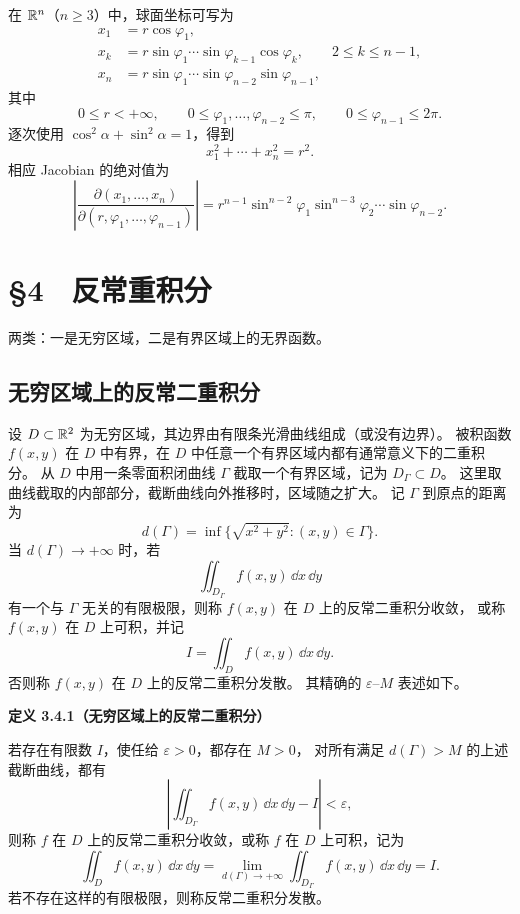 在 $\mathbb{R}^n$（$n\ge3$）中，球面坐标可写为
\[
\begin{aligned}
x_1&=r\cos\varphi_1,\\
x_k&=r\sin\varphi_1\cdots\sin\varphi_{k-1}\cos\varphi_k,
\qquad 2\le k\le n-1,\\
x_n&=r\sin\varphi_1\cdots\sin\varphi_{n-2}\sin\varphi_{n-1},
\end{aligned}
\]
其中
\[
0\le r<+\infty,\qquad
0\le\varphi_1,\ldots,\varphi_{n-2}\le\pi,\qquad
0\le\varphi_{n-1}\le2\pi.
\]
逐次使用 $\cos^2\alpha+\sin^2\alpha=1$，得到
\[
x_1^2+\cdots+x_n^2=r^2.
\]
相应 Jacobian 的绝对值为
\[
\left|\frac{\partial(x_1,\ldots,x_n)}
{\partial(r,\varphi_1,\ldots,\varphi_{n-1})}\right|
=r^{n-1}\sin^{n-2}\varphi_1\sin^{n-3}\varphi_2\cdots\sin\varphi_{n-2}.
\]









\section*{§4　反常重积分}

两类：一是无穷区域，二是有界区域上的无界函数。

\subsection*{无穷区域上的反常二重积分}

设 $D\subset\mathbb{R}^2$ 为无穷区域，其边界由有限条光滑曲线组成（或没有边界）。
被积函数 $f(x,y)$ 在 $D$ 中有界，在 $D$ 中任意一个有界区域内都有通常意义下的二重积分。
从 $D$ 中用一条零面积闭曲线 $\Gamma$ 截取一个有界区域，记为 $D_\Gamma\subset D$。
这里取曲线截取的内部部分，截断曲线向外推移时，区域随之扩大。
记 $\Gamma$ 到原点的距离为
\[
d(\Gamma)=\inf\{\sqrt{x^2+y^2}:(x,y)\in\Gamma\}.
\]
当 $d(\Gamma)\to+\infty$ 时，若
\[
\displaystyle\iint_{D_\Gamma}f(x,y)\,\dd x\,\dd y
\]
有一个与 $\Gamma$ 无关的有限极限，则称 $f(x,y)$ 在 $D$ 上的反常二重积分收敛，
或称 $f(x,y)$ 在 $D$ 上可积，并记
\[
I=\displaystyle\iint_Df(x,y)\,\dd x\,\dd y.
\]
否则称 $f(x,y)$ 在 $D$ 上的反常二重积分发散。
其精确的 $\varepsilon$--$M$ 表述如下。



\textbf{定义 3.4.1（无穷区域上的反常二重积分）}


若存在有限数 $I$，使任给 $\varepsilon>0$，都存在 $M>0$，
对所有满足 $d(\Gamma)>M$ 的上述截断曲线，都有
\[
\left|\displaystyle\iint_{D_\Gamma}f(x,y)\,\dd x\,\dd y-I\right|<\varepsilon,
\]
则称 $f$ 在 $D$ 上的反常二重积分收敛，或称 $f$ 在 $D$ 上可积，记为
\[
\displaystyle\iint_Df(x,y)\,\dd x\,\dd y
=\lim_{d(\Gamma)\to+\infty}\displaystyle\iint_{D_\Gamma}f(x,y)\,\dd x\,\dd y=I.
\]
若不存在这样的有限极限，则称反常二重积分发散。




